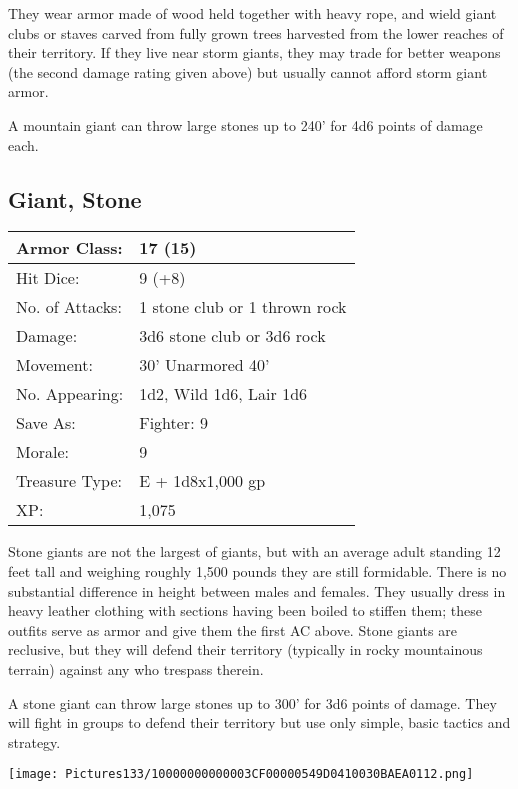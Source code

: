 \documentclass[a4paper,twoside,openany,10pt]{book}
\begin{document}
\begin{multicols}{2}
They wear armor made of wood held together with heavy rope, and wield giant clubs or staves carved from fully grown trees harvested from the lower reaches of their territory. If they live near storm giants, they may trade for better weapons (the second damage rating given above) but usually cannot afford storm giant armor.

A mountain giant can throw large stones up to 240' for 4d6 points of damage each.

\columnbreak

\subsection*{Giant, Stone}\label{giant-stone}

\begin{tabularx}{0.48\textwidth}{@{}lX@{}}
Armor Class: & 17 (15) \\\hline
Hit Dice: & 9 (+8) \\\hline
No. of Attacks: & 1 stone club or 1 thrown rock \\\hline
Damage: & 3d6 stone club or 3d6 rock \\\hline
Movement: & 30' Unarmored 40' \\\hline
No. Appearing: & 1d2, Wild 1d6, Lair 1d6 \\\hline
Save As: & Fighter: 9 \\\hline
Morale: & 9 \\\hline
Treasure Type: & E + 1d8x1,000 gp \\\hline
XP: & 1,075 \\\hline
\end{tabularx}\medskip

Stone giants are not the largest of giants, but with an average adult standing 12 feet tall and weighing roughly 1,500 pounds they are still formidable. There is no substantial difference in height between males and females. They usually dress in heavy leather clothing with sections having been boiled to stiffen them; these outfits serve as armor and give them the first AC above. Stone giants are reclusive, but they will defend their territory (typically in rocky mountainous terrain) against any who trespass therein.

A stone giant can throw large stones up to 300' for 3d6 points of damage. They will fight in groups to defend their territory but use only simple, basic tactics and strategy. 

\begin{center}
	\texttt{[image: Pictures133/10000000000003CF00000549D0410030BAEA0112.png]}
\end{center}


\end{multicols}
\end{document}
